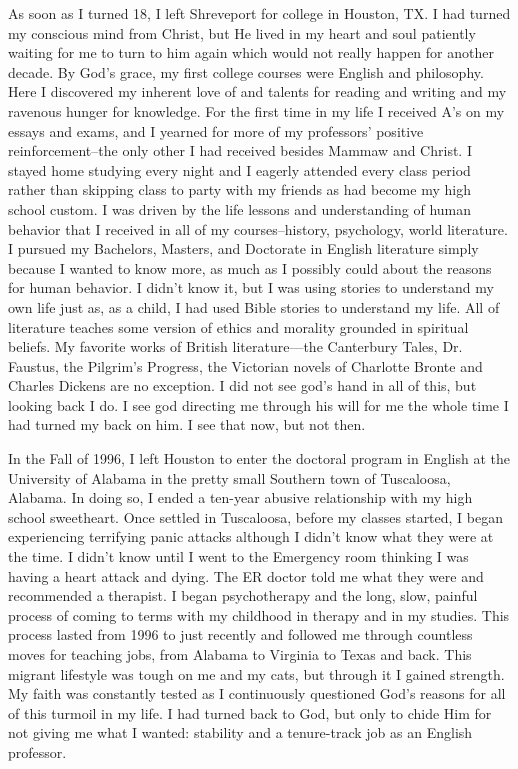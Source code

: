 \documentclass{article}
\begin{document}
As soon as I turned 18, I left Shreveport for college in Houston, TX. 
I had turned my conscious mind from Christ, but He lived in my heart and soul patiently waiting for me to turn to him again which would not really happen for another decade. 
By God's grace, my first college courses were English and philosophy. 
Here I discovered my inherent love of and talents for reading and writing and my ravenous hunger for knowledge. 
For the first time in my life I received A's on my essays and exams, and I yearned for more of my professors' positive reinforcement--the only other I had received besides Mammaw and Christ. 
I stayed home studying every night and I eagerly attended every class period rather than skipping class to party with my friends as had become my high school custom. 
I was driven by the life lessons and understanding of human behavior that I received in all of my courses--history, psychology, world literature. I pursued my Bachelors, Masters, and Doctorate in English literature simply because I wanted to know more, as much as I possibly could about the reasons for human behavior. 
I didn’t know it, but I was using stories to understand my own life just as, as a child,  I had used Bible stories to understand my life. 
All of literature teaches some version of ethics and morality grounded in spiritual beliefs. 
My favorite works of British literature—the Canterbury Tales, Dr. Faustus, the Pilgrim’s Progress, the Victorian novels of Charlotte Bronte and Charles Dickens are no exception. 
I did not see god's hand in all of this, but looking back I do. 
I see god directing me through his will for me the whole time I had turned my back on him.
I see that now, but not then.
 
In the Fall of 1996, I left Houston to enter the doctoral program in English at the University of Alabama in the pretty small Southern town of Tuscaloosa, Alabama. 
In doing so, I ended a ten-year abusive relationship with my high school sweetheart. 
Once settled in Tuscaloosa, before my classes started, I began experiencing terrifying panic attacks although I didn't know what they were at the time. 
I didn't know until I went to the Emergency room thinking I was having a heart attack and dying. 
The ER doctor told me what they were and recommended a therapist. 
I began psychotherapy and the long, slow, painful process of coming to terms with my childhood in therapy and in my studies. 
This process lasted from 1996 to just recently and followed me through countless moves for teaching jobs, from Alabama to Virginia to Texas and back. 
This migrant lifestyle was tough on me and my cats, but through it I gained strength. 
My faith was constantly tested as I continuously questioned God's reasons for all of this turmoil in my life. 
I had turned back to God, but only to chide Him for not giving me what I wanted: stability and a tenure-track job as an English professor. 
\end{document}
